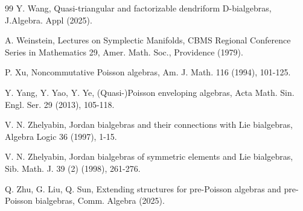 \documentclass[12pt]{amsart}
\theoremstyle{definition}
\begin{document}
\begin{thebibliography} {99}
  Y. Wang, Quasi-triangular and factorizable
dendriform D-bialgebras, J.Algebra. Appl (2025).

  A. Weinstein, Lectures on Symplectic Manifolds, CBMS Regional Conference Series in Mathematics 29, Amer.
Math. Soc., Providence (1979).

  P. Xu, Noncommutative Poisson algebras, Am. J. Math. 116 (1994), 101-125.
 
 Y. Yang, Y. Yao, Y. Ye, (Quasi-)Poisson enveloping algebras, Acta Math. Sin. Engl. Ser. 29 (2013), 105-118.

 V. N. Zhelyabin, Jordan bialgebras and their connections with Lie bialgebras, Algebra Logic 36 (1997), 1-15. 

  V. N. Zhelyabin, Jordan bialgebras of symmetric elements and Lie bialgebras, Sib. Math. J. 39 (2) (1998), 261-276.

 Q. Zhu, G. Liu, Q. Sun, Extending structures for pre-Poisson algebras and pre-Poisson bialgebras,  Comm. Algebra (2025).	

\end{thebibliography}
\end{document}
